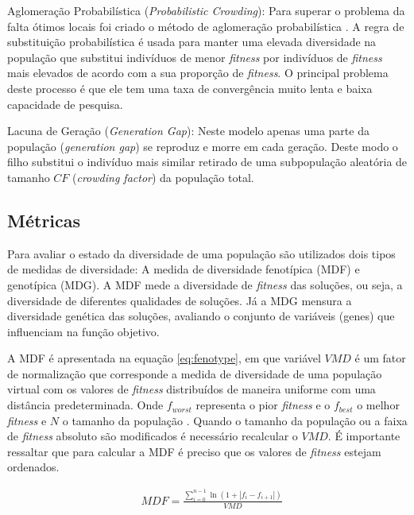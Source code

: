 Aglomeração Probabilística (\textit{Probabilistic Crowding}): Para superar o problema da falta ótimos locais foi criado o método de aglomeração probabilística \cite{probabilisti_crowding}. A regra de substituição probabilística é usada para manter uma elevada diversidade na população que substitui indivíduos de menor \textit{fitness} por indivíduos de \textit{fitness} mais elevados de acordo com a sua proporção de \textit{fitness}. O principal problema deste processo é que ele tem uma taxa de convergência muito lenta e baixa capacidade de pesquisa.

Lacuna de Geração (\textit{Generation Gap}): Neste modelo apenas uma parte da população (\textit{generation gap}) se reproduz e morre em cada geração. Deste modo o filho substitui o indivíduo mais similar retirado de uma subpopulação aleatória de tamanho $CF$ (\textit{crowding factor}) da população total.

\subsection{Métricas}
\label{sec:evaluete_diversity}

Para avaliar o estado da diversidade de uma população são utilizados dois tipos de medidas de diversidade: A medida de diversidade fenotípica (MDF) e genotípica (MDG). A MDF mede a diversidade de \textit{fitness} das soluções, ou seja, a diversidade de diferentes qualidades de soluções. Já a MDG mensura a diversidade genética das soluções, avaliando o conjunto de variáveis (genes) que influenciam na função objetivo.

A MDF é apresentada na equação \ref{eq:fenotype}, em que variável $VMD$ é um fator de normalização que corresponde a medida de diversidade de uma população virtual com os valores de \textit{fitness} distribuídos de maneira uniforme com uma distância predeterminada. Onde $f_{worst}$ representa o pior \textit{fitness} e o $f_{best}$ o melhor \textit{fitness} e $N$ o tamanho da população \cite{phenotypic}. Quando o tamanho da população ou a faixa de \textit{fitness} absoluto são modificados é necessário recalcular o $VMD$. É importante ressaltar que para calcular a MDF é preciso que os valores de \textit{fitness} estejam ordenados.

\begin{equation}
\label{eq:fenotype}
\begin{split}
& MDF = \frac{\sum_{i=0}^{n-1} \ln(1 + |f_i - f_{i+1}|)}{VMD} \\
\end{split}
\end{equation}

